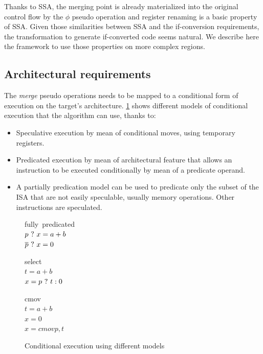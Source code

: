Thanks to SSA, the merging point is already materialized into the original control flow by the $\phi$ pseudo operation and register renaming is a basic property of SSA. Given those similarities between SSA and the if-conversion requirements, the transformation to generate if-converted code seems natural. We describe here the framework to use those properties on more complex regions.

\subsection{Architectural requirements}

The \textit{merge} pseudo operations needs to be mapped to a conditional form of execution on the target's architecture. \ref{fig:pred} shows different models of conditional execution that the algorithm can use, thanks to:

\begin{itemize}
\item Speculative execution by mean of conditional moves, using temporary registers.
\item Predicated execution by mean of architectural feature that allows an instruction to be executed conditionally by mean of a predicate operand.
\item A partially predication model can be used to predicate only the subset of the ISA that are not easily speculable, usually memory operations. Other instructions are speculated.
\end{itemize}

\begin{figure}
\footnotesize
\begin{minipage}[t]{3cm}
\mbox{fully predicated} \\
$p ~?~ x = a + b $ \\
$\overline{p} ~?~ x = 0 $ \\
\end{minipage} 
\begin{minipage}[t]{3cm}
\mbox{select} \\
$t = a + b $ \\
$x= p ~?~ t : 0 $ \\
\end{minipage}
\begin{minipage}[t]{3cm}
\mbox{cmov} \\
$t = a + b $ \\
$x = 0 $ \\
$x = cmov p,t$ \\
\end{minipage}
\caption{Conditional execution using different models}
\label{fig:pred}
\end{figure}


